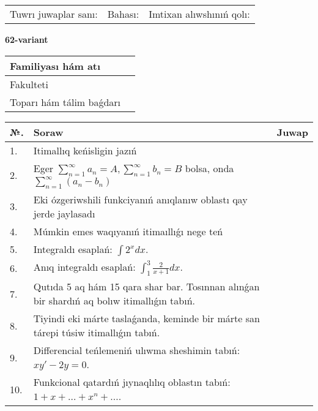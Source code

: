 \documentclass{article}
\begin{document}
\vspace{1cm}

\begin{tabular}{ c c c }
Tuwrı juwaplar sanı: \underline{\hspace{2cm}} & Bahası: \underline{\hspace{2cm}} & Imtixan alıwshınıń qolı: \underline{\hspace{2cm}} \\
\end{tabular}

\newpage

\begin{center}\textbf{62-variant}\end{center}

\bgroup
\def\arraystretch{1.5}
\begin{tabular}{ |m{6cm}|m{10cm}| }
  \hline
  Familiyası hám atı & \\
  \hline
  Fakulteti &\\
  \hline
  Toparı hám tálim baǵdarı & \\
  \hline
\end{tabular}
\egroup

\vspace{0.5cm}

\bgroup
\def\arraystretch{2}
\begin{tabular}{ |l|m{8cm}|m{7cm}| }
  \hline
  №. & Soraw & Juwap \\
  \hline
  1. & Itimallıq keńisligin jazıń &  \\
  \hline
  2. & Eger $\displaystyle\sum_{n = 1}^{\infty}a_{n} = A, \sum_{n = 1}^{\infty}b_{n} = B$ bolsa, onda $\displaystyle\sum_{n = 1}^{\infty}\left( a_{n} - b_{n} \right)$ &  \\
  \hline
  3. & Eki ózgeriwshili funkciyanıń anıqlanıw oblastı qay jerde jaylasadı &  \\
  \hline
  4. & Múmkin emes waqıyanıń itimaıllıǵı nege teń &  \\
  \hline
  5. & Integraldı esaplań: $\displaystyle\int {2^{x}dx} $. &  \\
  \hline
  6. & Anıq integraldı esaplań: $\displaystyle\int_{1}^{3}{\frac{2}{x + 1}dx}$. &  \\
  \hline
  7. & Qutıda 5 aq hám 15 qara shar bar. Tosınnan alınǵan bir shardıń aq bolıw itimallıǵın tabıń. &  \\
  \hline
  8. & Tiyindi eki márte taslaǵanda, keminde bir márte san tárepi túsiw itimallıǵın tabıń. &  \\
  \hline
  9. & Differencial teńlemeniń ulıwma sheshimin tabıń: $xy' - 2y = 0$. &  \\
  \hline
  10. & Funkcional qatardıń jıynaqlılıq oblastın tabıń: $1 + x + \ldots + x^{n} + \ldots$. &  \\
  \hline
\end{tabular}
\egroup
\end{document}
